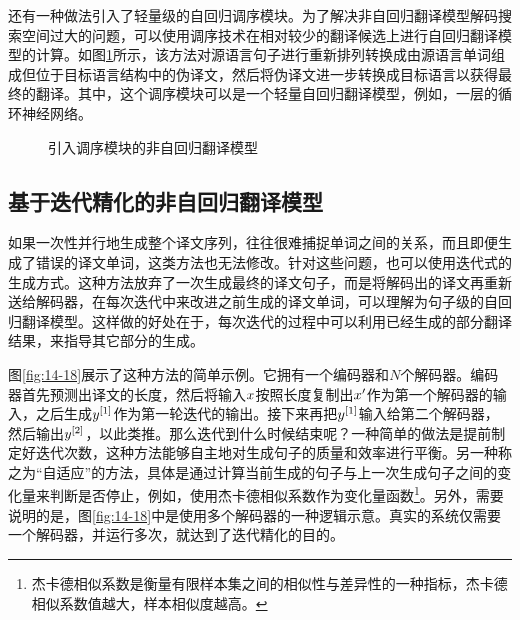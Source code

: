 \parinterval 还有一种做法引入了轻量级的自回归调序模块。为了解决非自回归翻译模型解码搜索空间过大的问题，可以使用调序技术在相对较少的翻译候选上进行自回归翻译模型的计算。如图\ref{fig:14-22}所示，该方法对源语言句子进行重新排列转换成由源语言单词组成但位于目标语言结构中的伪译文，然后将伪译文进一步转换成目标语言以获得最终的翻译。其中，这个调序模块可以是一个轻量自回归翻译模型，例如，一层的循环神经网络。

\begin{figure}[htp]
\centering
 
\caption{引入调序模块的非自回归翻译模型}
\label{fig:14-22}
\end{figure}


\subsection{基于迭代精化的非自回归翻译模型}

\parinterval 如果一次性并行地生成整个译文序列，往往很难捕捉单词之间的关系，而且即便生成了错误的译文单词，这类方法也无法修改。针对这些问题，也可以使用迭代式的生成方式。这种方法放弃了一次生成最终的译文句子，而是将解码出的译文再重新送给解码器，在每次迭代中来改进之前生成的译文单词，可以理解为句子级的自回归翻译模型。这样做的好处在于，每次迭代的过程中可以利用已经生成的部分翻译结果，来指导其它部分的生成。

\parinterval 图\ref{fig:14-18}展示了这种方法的简单示例。它拥有一个编码器和$N$个解码器。编码器首先预测出译文的长度，然后将输入${x}$按照长度复制出${x'}$作为第一个解码器的输入，之后生成${y}^{[1]}$作为第一轮迭代的输出。接下来再把${y}^{[1]}$输入给第二个解码器，然后输出${y}^{[2]}$，以此类推。那么迭代到什么时候结束呢？一种简单的做法是提前制定好迭代次数，这种方法能够自主地对生成句子的质量和效率进行平衡。另一种称之为“自适应”的方法，具体是通过计算当前生成的句子与上一次生成句子之间的变化量来判断是否停止，例如，使用杰卡德相似系数作为变化量函数\footnote{杰卡德相似系数是衡量有限样本集之间的相似性与差异性的一种指标，杰卡德相似系数值越大，样本相似度越高。}。另外，需要说明的是，图\ref{fig:14-18}中是使用多个解码器的一种逻辑示意。真实的系统仅需要一个解码器，并运行多次，就达到了迭代精化的目的。

